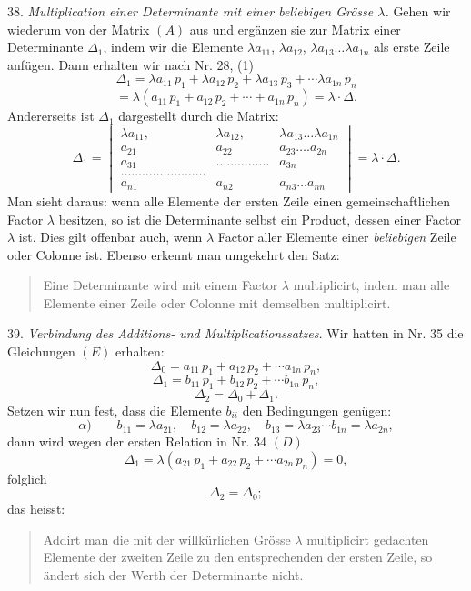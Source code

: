 \documentclass[11pt]{article}
\providecommand{\weberpage}[1]{}
\begin{document}
\weberpage{42}
38. \textit{Multiplication einer Determinante mit einer beliebigen Grösse $\lambda$.} Gehen wir wiederum von der Matrix $(A)$ aus und ergänzen sie zur Matrix einer Determinante $\varDelta_1$, indem wir die Elemente $\lambda a_{11}$, $\lambda a_{12}$, $\lambda a_{13} \ldots \lambda a_{1n}$ als erste Zeile anfügen. Dann erhalten wir nach Nr. 28, (1)
\[
\varDelta_1 = \lambda a_{11}\,p_1 + \lambda a_{12}\,p_2 + \lambda a_{13}\,p_3 + \cdots \lambda a_{1n}\,p_n
\]
\[
= \lambda(a_{11}\,p_1 + a_{12}\,p_2 + \cdots + a_{1n}\,p_n) = \lambda \cdot \varDelta.
\]
Andererseits ist $\varDelta_1$ dargestellt durch die Matrix:
\[
\varDelta_1 = \begin{vmatrix}
\lambda a_{11}, & \lambda a_{12}, & \lambda a_{13} \ldots \lambda a_{1n}\\
a_{21} & a_{22} & a_{23} \ldots . a_{2n}\\
a_{31} & \ldots\ldots\ldots\ldots\ldots & a_{3n}\\
\ldots\ldots\ldots\ldots\ldots\ldots\ldots\ldots\\
a_{n1} & a_{n2} & a_{n3} \ldots a_{nn}
\end{vmatrix} = \lambda \cdot \varDelta.
\]
Man sieht daraus: wenn alle Elemente der ersten Zeile einen gemeinschaftlichen Factor $\lambda$ besitzen, so ist die Determinante selbst ein Product, dessen einer Factor $\lambda$ ist. Dies gilt offenbar auch, wenn $\lambda$ Factor aller Elemente einer \textit{beliebigen} Zeile oder Colonne ist. Ebenso erkennt man umgekehrt den Satz:
\begin{quote}
\glqq Eine Determinante wird mit einem Factor $\lambda$ multiplicirt, indem man alle Elemente einer Zeile oder Colonne mit demselben multiplicirt.\grqq{}
\end{quote}
39. \textit{Verbindung des Additions- und Multiplicationssatzes.} Wir hatten in Nr. 35 die Gleichungen $(E)$ erhalten:
\[
\varDelta_0 = a_{11}\,p_1 + a_{12}\,p_2 + \cdots a_{1n}\,p_n,
\]
\[
\varDelta_1 = b_{11}\,p_1 + b_{12}\,p_2 + \cdots b_{1n}\,p_n,
\]
\[
\varDelta_2 = \varDelta_0 + \varDelta_1.
\]
Setzen wir nun fest, dass die Elemente $b_{ii}$ den Bedingungen genügen:
\[
\alpha)\qquad b_{11} = \lambda a_{21}, \quad b_{12} = \lambda a_{22}, \quad b_{13} = \lambda a_{23} \cdots b_{1n} = \lambda a_{2n},
\]
dann wird wegen der ersten Relation in Nr. 34 $(D)$
\[
\varDelta_1 = \lambda(a_{21}\,p_1 + a_{22}\,p_2 + \cdots a_{2n}\,p_n) = 0,
\]
folglich
\[
\varDelta_2 = \varDelta_0;
\]
das heisst:
\begin{quote}
\glqq Addirt man die mit der willkürlichen Grösse $\lambda$ multiplicirt gedachten Elemente der zweiten Zeile zu den entsprechenden der ersten Zeile, so ändert sich der Werth der Determinante nicht.\grqq{}
\end{quote}
\end{document}
